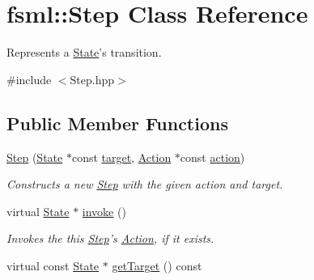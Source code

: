 \hypertarget{classfsml_1_1Step}{\section{fsml\-:\-:Step Class Reference}
\label{classfsml_1_1Step}
}


Represents a \hyperlink{classfsml_1_1State}{State}'s transition.  




{\ttfamily \#include $<$Step.\-hpp$>$}

\subsection*{Public Member Functions}
\begin{DoxyCompactItemize}
\item 
\hyperlink{classfsml_1_1Step_a5f656cb2f850f8a24afc710f4904ef43}{Step} (\hyperlink{classfsml_1_1State}{State} $\ast$const \hyperlink{classfsml_1_1Step_a02a455c14aa6b6435137d37040da1576}{target}, \hyperlink{classfsml_1_1Action}{Action} $\ast$const \hyperlink{classfsml_1_1Step_acefa781aa49679af3c151194e58c6a85}{action})
\begin{DoxyCompactList}\small\item\em Constructs a new \hyperlink{classfsml_1_1Step}{Step} with the given action and target. \end{DoxyCompactList}\item 
virtual \hyperlink{classfsml_1_1State}{State} $\ast$ \hyperlink{classfsml_1_1Step_ab71a0687e8cfff12deed6b1916ff1ba3}{invoke} ()
\begin{DoxyCompactList}\small\item\em Invokes the this \hyperlink{classfsml_1_1Step}{Step}'s \hyperlink{classfsml_1_1Action}{Action}, if it exists. \end{DoxyCompactList}\item 
virtual const \hyperlink{classfsml_1_1State}{State} $\ast$ \hyperlink{classfsml_1_1Step_a1d0ba0e93765b946de082651f68cd3fb}{get\-Target} () const 
\end{DoxyCompactItemize}
